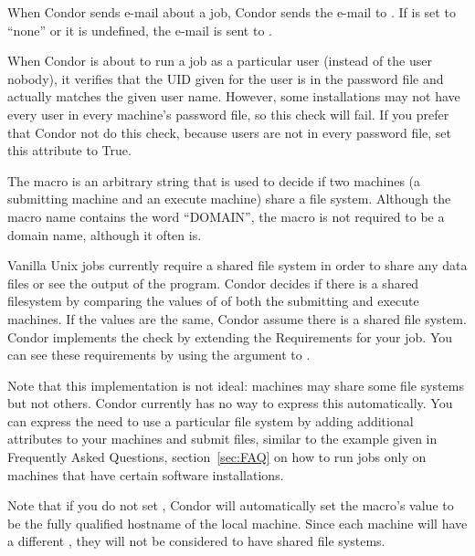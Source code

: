 \begin{description}
When Condor sends e-mail about a job, Condor sends the e-mail to
.
If 
is set to ``none'' or it is undefined, 
the e-mail is
sent to .


\item[\Macro{SOFT\_UID\_DOMAIN}] \label{param:SoftUidDomain}
When Condor is about to run a job as a particular user (instead of the
user nobody), it verifies that the UID given for the user is in the
password file and actually matches the given user name.
However, some
installations may not have every user in every machine's password
file, so this check will fail. If you prefer that Condor not do
this check, because users are not in every password file, set
this attribute to True.



\item[\Macro{FILESYSTEM\_DOMAIN}] \label{param:FilesystemDomain}
The 
macro is an arbitrary string that is used to decide if
two machines (a submitting machine and an execute machine) share a
file system.
Although the macro name contains the word ``DOMAIN'',
the macro is not required to be a domain name, although it often is.

Vanilla Unix jobs currently require a shared file system in order to
share any data files or see the output of the program.
Condor decides if there is a shared filesystem by comparing the values
of 
of both the submitting and execute machines.
If the values are the same,
Condor assume there is a shared file system.
Condor implements the check
by extending the Requirements for your job.
You can see these requirements by using the  argument
to .

Note that this implementation is not ideal: machines may share some
file systems but not others. Condor currently has no way to express
this automatically. You can express the need to use a
particular file system by adding additional attributes to your machines
and submit files, similar to the example given in 
Frequently Asked Questions, 
section~\ref{sec:FAQ} on
how to run jobs only on machines that have 
certain software installations.

Note that if you do not set 
, Condor will
automatically set the macro's value to be the fully qualified hostname
of the local machine.
Since each machine will have a different
,
they will not be considered to have shared file systems.


\end{description}
